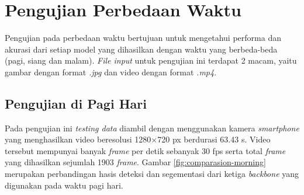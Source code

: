 \section{Pengujian Perbedaan Waktu}
\label{sec:pengujian-waktu}

Pengujian pada perbedaan waktu bertujuan untuk mengetahui performa dan akurasi dari setiap model yang dihasilkan dengan waktu yang berbeda-beda (pagi, siang dan malam). \textit{File input} untuk pengujian ini terdapat 2 macam, yaitu gambar dengan format \textit{.jpg} dan video dengan format \textit{.mp4}.

\subsection{Pengujian di Pagi Hari}
\label{subsec:pagi}

Pada pengujian ini \textit{testing data} diambil dengan menggunakan kamera \textit{smartphone} yang menghasilkan video beresolusi 1280$\times$720 px berdurasi 63.43 s. Video tersebut mempunyai banyak \textit{frame} per detik sebanyak 30 fps serta total \textit{frame} yang dihasilkan sejumlah 1903 \textit{frame}. Gambar \ref{fig:comparasion-morning} merupakan perbandingan hasis deteksi dan segementasi dari ketiga \textit{backbone} yang digunakan pada waktu pagi hari.


